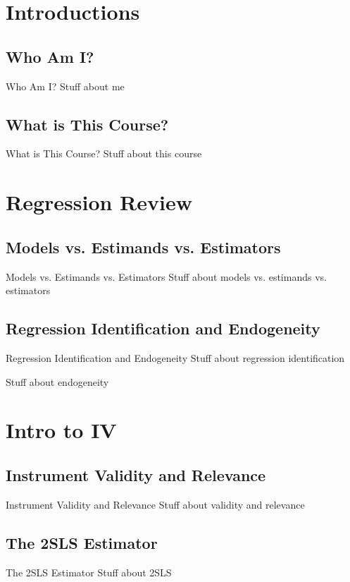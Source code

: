 \documentclass{beamer}
\begin{document}

\section{Introductions}

\subsection{Who Am I?}
\begin{frame}{Who Am I?}
Stuff about me
\end{frame}

\subsection{What is This Course?}
\begin{frame}{What is This Course?}
Stuff about this course
\end{frame}

\section{Regression Review}

\subsection{Models vs. Estimands vs. Estimators}
\begin{frame}{Models vs. Estimands vs. Estimators}
Stuff about models vs. estimands vs. estimators
\end{frame}

\subsection{Regression Identification and Endogeneity}
\begin{frame}{Regression Identification and Endogeneity}
Stuff about regression identification
\end{frame}

\begin{frame}
Stuff about endogeneity
\end{frame}

\section{Intro to IV}

\subsection{Instrument Validity and Relevance}
\begin{frame}{Instrument Validity and Relevance}
Stuff about validity and relevance
\end{frame}

\subsection{The 2SLS Estimator}
\begin{frame}{The 2SLS Estimator}
Stuff about 2SLS
\end{frame}
\end{document}
